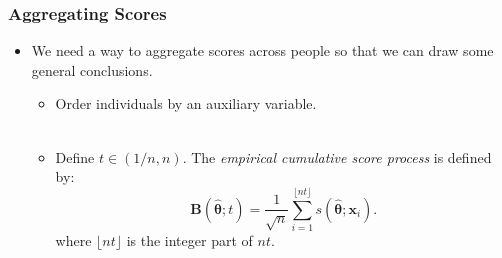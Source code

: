 \documentclass{beamer}
\begin{document}
\begin{frame}[fragile]
  \frametitle{Aggregating Scores}
  \begin{itemize}
    \item We need a way to aggregate scores across people so that we
      can draw some general conclusions.
      \begin{itemize}
        \item Order individuals by an auxiliary variable.\\ \ \\
        \item Define $t \in (1/n, n)$.
          The {\em empirical cumulative score process} is defined by:\\
  \begin{equation*}
    \bm{B}(\hat{\bm{\theta}}; t) = \frac{1}{\sqrt{n}}
    \displaystyle\sum_{i=1}^{\lfloor nt 
      \rfloor} s(\hat{\bm{\theta}} ; \bm{x}_i).
    \end{equation*}
  where $\lfloor nt \rfloor$ is the integer part of $nt$.
      \end{itemize}
  \end{itemize}
\end{frame}

\end{document}
